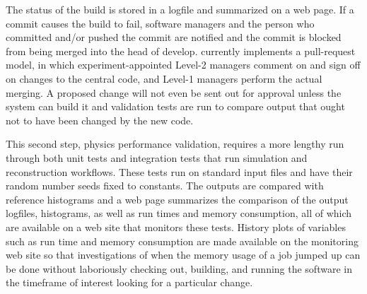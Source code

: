 \documentclass[../main-v1.tex]{subfiles}
\begin{document}
The status of the build is stored in a logfile and summarized on a web page.  If a commit causes the build to fail, software managers and the person who committed and/or pushed the commit are notified and the commit is blocked from being merged into the head of develop.   currently implements a pull-request model, in which experiment-appointed Level-2 managers comment on and sign off on changes to the central code, and Level-1 managers perform the actual merging.  A proposed change will not even be sent out for approval unless the  system can build it and validation tests are run to compare output that ought not to have been changed by the new code.

This second step, physics performance validation, requires a more lengthy run through both unit tests and integration tests that run simulation and reconstruction workflows.  These tests run on standard input files and have their random number seeds fixed to constants.  The outputs are compared with reference histograms and a web page summarizes the comparison of the output logfiles, histograms, as well as run times and memory consumption, all of which are available on a web site that monitors these tests.  History plots of variables such as run time and memory consumption are made available on the monitoring web site so that investigations of when the memory usage of a job jumped up can be done without laboriously checking out, building, and running the software in the %
timeframe of interest looking for a particular change.
\end{document}
